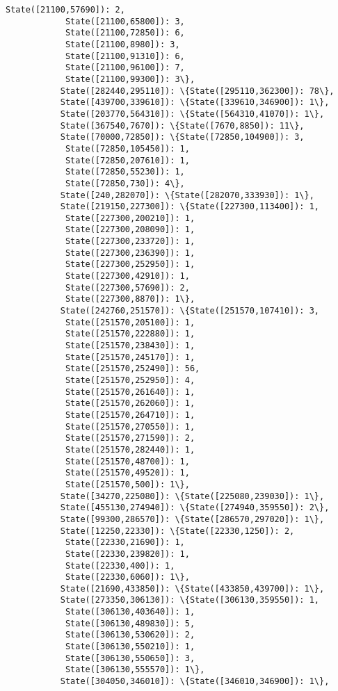 \documentclass[11pt]{article}
\begin{document}
\begin{Verbatim}[commandchars=\\\{\}]
            State([21100,57690]): 2,
            State([21100,65800]): 3,
            State([21100,72850]): 6,
            State([21100,8980]): 3,
            State([21100,91310]): 6,
            State([21100,96100]): 7,
            State([21100,99300]): 3\},
           State([282440,295110]): \{State([295110,362300]): 78\},
           State([439700,339610]): \{State([339610,346900]): 1\},
           State([203770,564310]): \{State([564310,41070]): 1\},
           State([367540,7670]): \{State([7670,8850]): 11\},
           State([70000,72850]): \{State([72850,104900]): 3,
            State([72850,105450]): 1,
            State([72850,207610]): 1,
            State([72850,55230]): 1,
            State([72850,730]): 4\},
           State([240,282070]): \{State([282070,333930]): 1\},
           State([219150,227300]): \{State([227300,113400]): 1,
            State([227300,200210]): 1,
            State([227300,208090]): 1,
            State([227300,233720]): 1,
            State([227300,236390]): 1,
            State([227300,252950]): 1,
            State([227300,42910]): 1,
            State([227300,57690]): 2,
            State([227300,8870]): 1\},
           State([242760,251570]): \{State([251570,107410]): 3,
            State([251570,205100]): 1,
            State([251570,222880]): 1,
            State([251570,238430]): 1,
            State([251570,245170]): 1,
            State([251570,252490]): 56,
            State([251570,252950]): 4,
            State([251570,261640]): 1,
            State([251570,262060]): 1,
            State([251570,264710]): 1,
            State([251570,270550]): 1,
            State([251570,271590]): 2,
            State([251570,282440]): 1,
            State([251570,48700]): 1,
            State([251570,49520]): 1,
            State([251570,500]): 1\},
           State([34270,225080]): \{State([225080,239030]): 1\},
           State([455130,274940]): \{State([274940,359550]): 2\},
           State([99300,286570]): \{State([286570,297020]): 1\},
           State([12250,22330]): \{State([22330,1250]): 2,
            State([22330,21690]): 1,
            State([22330,239820]): 1,
            State([22330,400]): 1,
            State([22330,6060]): 1\},
           State([21690,433850]): \{State([433850,439700]): 1\},
           State([273350,306130]): \{State([306130,359550]): 1,
            State([306130,403640]): 1,
            State([306130,489830]): 5,
            State([306130,530620]): 2,
            State([306130,550210]): 1,
            State([306130,550650]): 3,
            State([306130,555570]): 1\},
           State([304050,346010]): \{State([346010,346900]): 1\},

\end{Verbatim}
\end{document}

